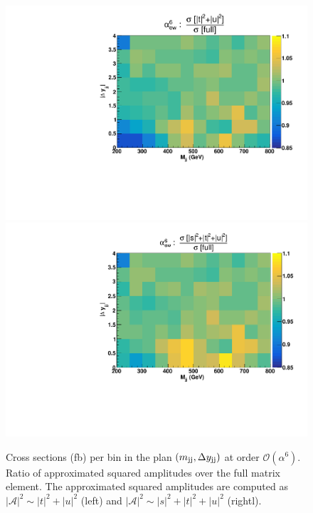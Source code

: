 





\begin{figure}[hbt]
\centering
\includegraphics[scale=0.395]{figures/scanfigures/ratio_tu.pdf}
\includegraphics[scale=0.395]{figures/scanfigures/ratio_stu.pdf}
\caption{Cross sections (fb) per bin in the plan $\left(m_{\text{j}\text{j}}, \Delta y_{\text{j}\text{j}}\right)$ at order $\mathcal{O}(\alpha^6)$. 
Ratio of approximated squared amplitudes over the full matrix element. The approximated squared amplitudes are computed as $|\mathcal{A}|^2 \sim |t|^2 + |u|^2$ (left) and $|\mathcal{A}|^2 \sim |s|^2 + |t|^2 + |u|^2$ (rightl).}
\label{fig:ratio2d_LO}
\end{figure}

